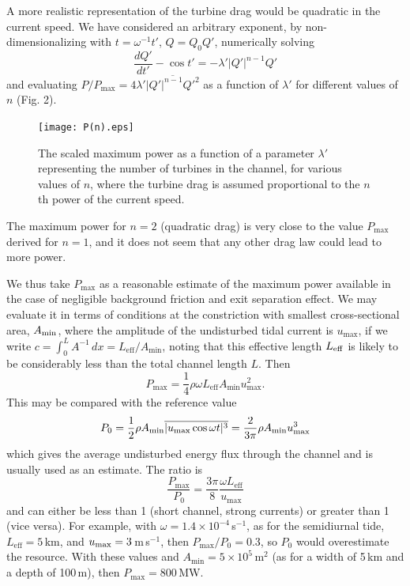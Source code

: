 \documentclass[11pt]{article}
\begin{document}
A more realistic representation of the turbine drag would be quadratic in the current speed. We have considered an arbitrary exponent, by non-dimensionalizing with $t = \omega^{-1}t'$, $Q=Q_0Q'$, numerically solving
\begin{equation}
\frac{dQ'}{dt'} -\cos t' = -\lambda' |Q'|^{n-1}Q'
\end{equation}
and evaluating $P/ P_\textrm{max} = 4\lambda'\overline{|Q'|^{n-1}Q'^2}$ as a function of $\lambda'$ for different values of $n$ (Fig. 2).
\begin{figure}
\centerline{\texttt{[image: P(n).eps]}}
\caption{\footnotesize The scaled maximum power as a function of a parameter $\lambda'$ representing the number of turbines in the channel, for various  values of $n$, where the turbine drag is assumed proportional to the $n$th power of the current speed.}
\label{Fig2}
\end{figure}
The maximum power  for $n=2$ (quadratic drag) is very close to the value $P_\textrm{max}$ derived for $n=1$, and it does not seem that any other drag law could lead to more power.

We thus take $P_\textrm{max}$ as a reasonable estimate of the maximum power available in the case of negligible background friction and exit separation effect. We may evaluate it in terms of conditions at the constriction with smallest cross-sectional area, $A_{\rm min}$, where the amplitude of the undisturbed tidal current is $u_\textrm{max}$, if we write $c = \int_0^L A^{-1} \, dx = L_\textrm{eff}/A_\textrm{min}$, noting that this effective length $L_{\rm eff}$ is likely to be considerably less than the total channel length $L$. Then
\begin{equation}
P_\textrm{max} = \frac{1}{4} \rho \omega L_\textrm{eff}A_\textrm{min}u_\textrm{max}^2.
\end{equation}
This may be compared with the reference value
\begin{equation}
P_0 = \frac{1}{2}\rho A_\textrm{min}\overline{|u_\textrm{max}\cos\omega t|^3}
= \frac{2}{3\pi} \rho A_\textrm{min}u_{\rm max}^3
\end{equation}
which gives the average undisturbed energy flux through the channel and is usually used as an estimate. The ratio is
\begin{equation}
\frac{P_\textrm{max}}{P_0} = \frac{3\pi}{8} \frac{\omega L_\textrm{eff}}{u_\textrm{max}}
\end{equation}
and can either be less than 1 (short channel, strong currents) or greater than 1 (vice versa). For example, with $\omega = 1.4\times 10^{-4}\,$s$^{-1}$, as for the semidiurnal tide, $L_\textrm{eff} = 5$\,km, and $u_{\rm max} = 3$\,m\,s$^{-1}$, then ${P_\textrm{max}/ P_0} = 0.3$, so $P_0$ would overestimate the resource. With these values and $A_\textrm{min} = 5\times 10^5$\,m$^2$ (as for a width of 5\,km and a depth of 100\,m),  then $P_\textrm{max}=800$\,MW.
\end{document}
